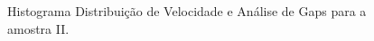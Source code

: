 \begin{anexosenv}
\begin{figure}[H]
\caption{Histograma Distribuição de Velocidade e Análise de Gaps para a amostra II.}
\label{fig:distrotation}%
\end{figure}


\end{anexosenv}
